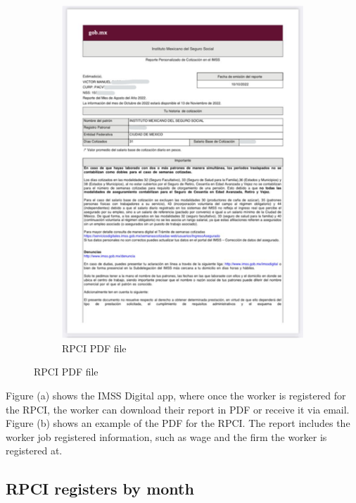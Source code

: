 \documentclass[oneside,11pt]{article}
\begin{document}
\begin{figure}[H]
\begin{center}
\begin{subfigure}{0.49\textwidth}
    \end{subfigure}
    \begin{subfigure}{0.49\textwidth}
    \caption{RPCI PDF file}
    \includegraphics[width=\textwidth]{04_Figures/rpci_app/rpci_3.png}
    \end{subfigure}
    

    \end{center}
\end{figure}
\scriptsize{
\noindent Figure (a) shows the IMSS Digital app, where once the worker is registered for the RPCI, the worker can download their report in PDF or receive it via email. Figure (b) shows an example of the PDF for the RPCI. The report includes the worker job registered information, such as wage and the firm the worker is registered at.
}

\clearpage

\subsection{RPCI registers by month}
\end{document}
